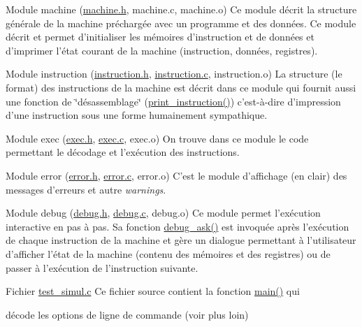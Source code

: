 \begin{DoxyDescription}
\item[\-Module {\ttfamily machine} (\hyperlink{machine_8h}{machine.\-h}, machine.\-c, machine.\-o) ]\-Ce module décrit la structure générale de la machine préchargée avec un programme et des données. \-Ce module décrit et permet d'initialiser les mémoires d'instruction et de données et d'imprimer l'état courant de la machine (instruction, données, registres). 


\item[\-Module {\ttfamily instruction} (\hyperlink{instruction_8h}{instruction.\-h}, \hyperlink{instruction_8c}{instruction.\-c}, instruction.\-o) ]\-La structure (le format) des instructions de la machine est décrit dans ce module qui fournit aussi une fonction de \char`\"{}désassemblage\char`\"{} (\hyperlink{instruction_8c_a437080d5e8c504588a47d0dba468492f}{print\-\_\-instruction()}) c'est-\/à-\/dire d'impression d'une instruction sous une forme humainement sympathique. 


\item[\-Module {\ttfamily exec} (\hyperlink{exec_8h}{exec.\-h}, \hyperlink{exec_8c}{exec.\-c}, exec.\-o) ]\-On trouve dans ce module le code permettant le décodage et l'exécution des instructions. 


\item[\-Module {\ttfamily error} (\hyperlink{error_8h}{error.\-h}, \hyperlink{error_8c}{error.\-c}, error.\-o) ]\-C'est le module d'affichage (en clair) des messages d'erreurs et autre {\itshape warnings\/}. 


\item[\-Module {\ttfamily debug} (\hyperlink{debug_8h}{debug.\-h}, \hyperlink{debug_8c}{debug.\-c}, debug.\-o) ]\-Ce module permet l'exécution interactive en pas à pas. \-Sa fonction \hyperlink{debug_8c_a3a88fdc680b7a1ae8c4c7c8ddee730ab}{debug\-\_\-ask()} est invoquée après l'exécution de chaque instruction de la machine et gère un dialogue permettant à l'utilisateur d'afficher l'état de la machine (contenu des mémoires et des registres) ou de passer à l'exécution de l'instruction suivante. 


\item[\-Fichier {\ttfamily \hyperlink{test__simul_8c}{test\-\_\-simul.\-c}}  ]\-Ce fichier source contient la fonction \hyperlink{test__simul_8c_a0ddf1224851353fc92bfbff6f499fa97}{main()} qui


\begin{DoxyItemize}
\item décode les options de ligne de commande (voir plus loin)



\end{DoxyItemize}
\end{DoxyDescription}
